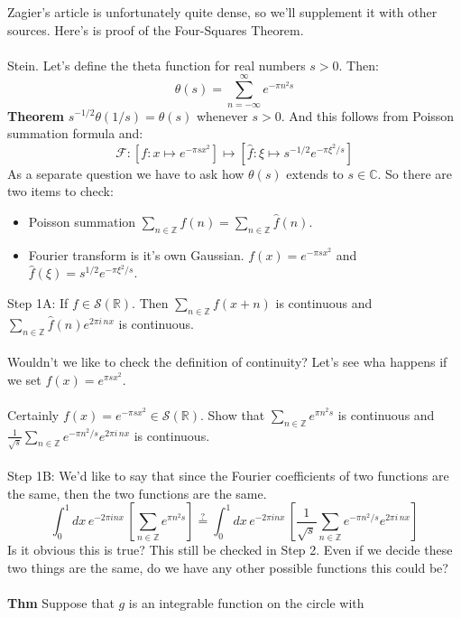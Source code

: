 \documentclass[12pt]{article}
\begin{document}
Zagier's article is unfortunately quite dense, so we'll supplement it with other sources. Here's is proof of the Four-Squares Theorem.\\ \\
Stein.  Let's define the theta function for real numbers $s > 0$.  Then:
$$ \theta(s) = \sum_{n = - \infty}^\infty e^{- \pi n^2 s}$$
\textbf{Theorem} $s^{-1/2} \theta(1/s) = \theta(s)$ whenever $s > 0$. And this follows from Poisson summation formula and:
$$ \mathcal{F}: [f:x \mapsto e^{-\pi s x^2}] \mapsto [\hat{f}:\xi \mapsto s^{-1/2} e^{-\pi\xi^2/s}] $$
As a separate question we have to ask how $\theta(s)$ extends to $s \in \mathbb{C}$.  So there are two items to check:
\begin{itemize}
\item Poisson summation $\displaystyle \sum_{n \in \mathbb{Z}} f(n) = \sum_{n \in \mathbb{Z}} \hat{f}(n)$.
\item Fourier transform is it's own Gaussian.  $f(x) = e^{-\pi s x^2}$ and $\hat{f}(\xi) = s^{1/2} e^{- \pi \xi^2 /s}$.
\end{itemize}
\newpage
\noindent Step 1A: If $f \in \mathcal{S}(\mathbb{R})$. Then
$\displaystyle \sum_{n \in \mathbb{Z}} f(x+n)$ is continuous and $\displaystyle \sum_{n \in \mathbb{Z}} \hat{f}(n) e^{2\pi i \, n x}$ is continuous. \\ \\
Wouldn't we like to check the definition of continuity?  Let's see wha happens if we set $f(x) = e^{\pi sx^2}$. \\ \\
Certainly $f(x) = e^{-\pi s x^2}\in \mathcal{S}(\mathbb{R})$.  Show that $\displaystyle \sum_{n \in \mathbb{Z}} e^{\pi n^2 s}$ is continuous and $\displaystyle  \frac{1}{\sqrt{s}} \sum_{n \in \mathbb{Z}}e^{- \pi n^2 / s} e^{2\pi i \, n x}$ is continuous. \\ \\
Step 1B: We'd like to say that since the Fourier coefficients of two functions are the same, then the two functions are the same.  
$$ \int_0^1 dx \, e^{- 2 \pi i n x}  \, \left[\sum_{n \in \mathbb{Z}} e^{\pi n^2 s}\right] \stackrel{?}{=} \int_0^1 dx \, e^{- 2\pi i n x} \, \left[\frac{1}{\sqrt{s}} \sum_{n \in \mathbb{Z}}e^{- \pi n^2 / s} e^{2\pi i \, n x}\right] $$
Is it obvious this is true?  This still be checked in Step 2.  Even if we decide these two things are the same, do we have any other possible functions this could be? \\ \\
\textbf{Thm} Suppose that $g$ is an integrable function on the circle with  
\end{document}
